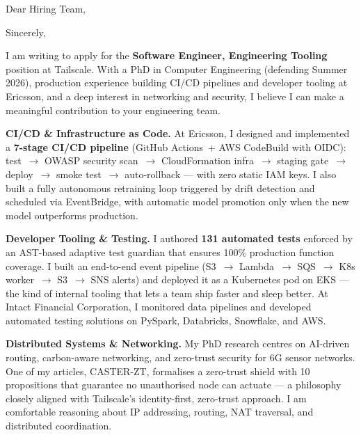 \documentclass[10pt,a4paper,sans]{moderncv}
\begin{document}
\date{March 30, 2026}
\opening{Dear Hiring Team,}
\closing{Sincerely,}

\makelettertitle

I am writing to apply for the \textbf{Software Engineer, Engineering Tooling}
position at Tailscale.  With a PhD in Computer Engineering (defending Summer
2026), production experience building CI/CD pipelines and developer tooling at
Ericsson, and a deep interest in networking and security, I believe I can make a
meaningful contribution to your engineering team.

\medskip

\textbf{CI/CD \& Infrastructure as Code.}\quad
At Ericsson, I designed and implemented a \textbf{7-stage CI/CD pipeline}
(GitHub Actions~+ AWS CodeBuild with OIDC): test~$\rightarrow$ OWASP security
scan~$\rightarrow$ CloudFormation infra~$\rightarrow$ staging gate~$\rightarrow$
deploy~$\rightarrow$ smoke test~$\rightarrow$ auto-rollback — with zero static
IAM keys.  I also built a fully autonomous retraining loop triggered by drift
detection and scheduled via EventBridge, with automatic model promotion only when
the new model outperforms production.

\medskip

\textbf{Developer Tooling \& Testing.}\quad
I authored \textbf{131 automated tests} enforced by an AST-based adaptive test
guardian that ensures 100\% production function coverage.  I built an end-to-end
event pipeline (S3~$\rightarrow$ Lambda~$\rightarrow$ SQS~$\rightarrow$ K8s
worker~$\rightarrow$ S3~$\rightarrow$ SNS alerts) and deployed it as a
Kubernetes pod on EKS — the kind of internal tooling that lets a team ship
faster and sleep better.  At Intact Financial Corporation, I monitored data
pipelines and developed automated testing solutions on PySpark, Databricks,
Snowflake, and AWS.

\medskip

\textbf{Distributed Systems \& Networking.}\quad
My PhD research centres on AI-driven routing, carbon-aware networking, and
zero-trust security for 6G sensor networks.  One of my articles, CASTER-ZT,
formalises a zero-trust shield with 10 propositions that guarantee no
unauthorised node can actuate — a philosophy closely aligned with Tailscale's
identity-first, zero-trust approach.  I am comfortable reasoning about IP
addressing, routing, NAT traversal, and distributed coordination.
\end{document}
